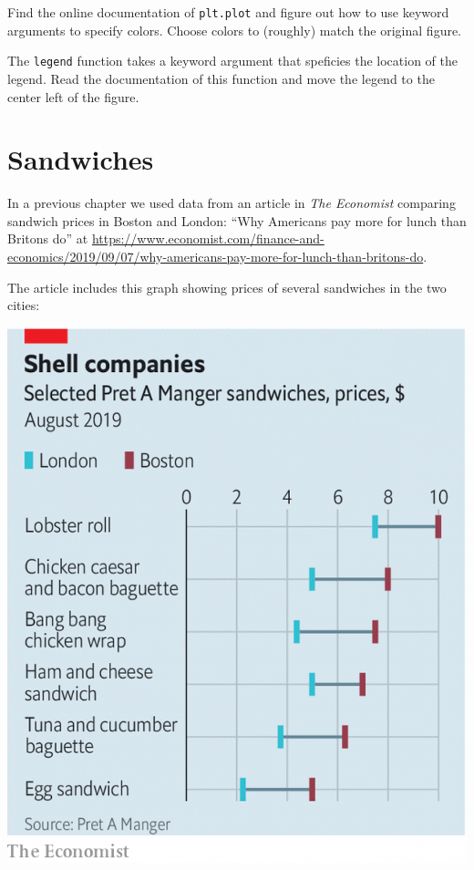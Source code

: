 Find the online documentation of \passthrough{\lstinline!plt.plot!} and
figure out how to use keyword arguments to specify colors. Choose colors
to (roughly) match the original figure.

The \passthrough{\lstinline!legend!} function takes a keyword argument
that speficies the location of the legend. Read the documentation of
this function and move the legend to the center left of the figure.

\hypertarget{sandwiches}{%
\section{Sandwiches}\label{sandwiches}}

In a previous chapter we used data from an article in \emph{The
Economist} comparing sandwich prices in Boston and London: ``Why
Americans pay more for lunch than Britons do'' at
\url{https://www.economist.com/finance-and-economics/2019/09/07/why-americans-pay-more-for-lunch-than-britons-do}.

The article includes this graph showing prices of several sandwiches in
the two cities:

\includegraphics{figs/20190907_FNC941.png}

